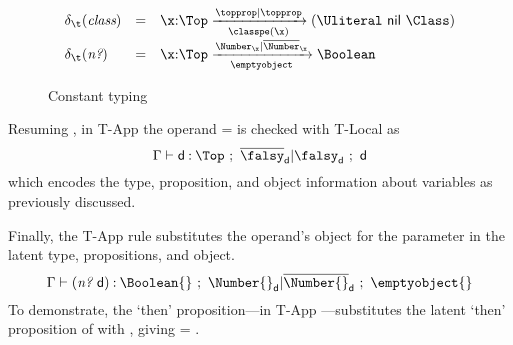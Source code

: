 \begin{figure}
  $$
\constanttypefigure{}
  $$
  \caption{Constant typing}
  \label{main:figure:constanttyping}
\end{figure}

Resuming {},
in T-App the operand \ep{} =  is checked with
T-Local as
\begin{equation}
\judgementselfrewrite{\propenv{}}
                     {\makelocal{d}}
                     {\Top}
                     {\filterset{\notprop{\falsy}{\makelocal{d}}}
                                {\isprop{\falsy}{\makelocal{d}}}}
                     {\makelocal{d}}
\end{equation}
which encodes the type, proposition, and object information
about variables
as previously discussed.

Finally, the T-App rule substitutes the operand's object \objectp{}
for the parameter \x{} in the latent type, propositions, and object.
\begin{equation}
\judgementselfrewrite{\propenv{}}
  {\appexp{\numberhuh{}}{\makelocal{d}}}
  {\Boolean{}}
  {\filterset{\isprop{\Number{}}{\makelocal{d}}}
             {\notprop{\Number{}}{\makelocal{d}}}}
  {\emptyobject{}}
\end{equation}
To demonstrate, the `then' proposition---in T-App {\replacefor {\thenprop{\prop{}}} {\objectp{}} {\x{}}}---substitutes
the latent `then' proposition of \constanttype{\numberhuh{}} with 
, giving
{\replacefor {\isprop{\Number{}}{\x{}}} {} {\x{}}} =
{}.

